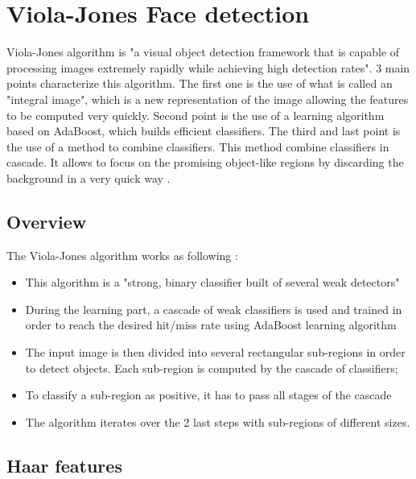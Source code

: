 \chapter{Viola-Jones Face detection}
\label{chap:vj}

\noindent Viola-Jones algorithm is "a visual object detection framework that is capable of processing images extremely rapidly while achieving high detection rates". 3 main points characterize this algorithm. The first one is the use of what is called an "integral image", which is a new representation of the image allowing the features to be computed very quickly. Second point is the use of a learning algorithm based on AdaBoost, which builds efficient classifiers. The third and last point is the use of a method to combine classifiers. This method combine classifiers in cascade. It allows to focus on the promising object-like regions by discarding the background in a very quick way \cite{VIO01}.
\newline

\section{Overview}

\vspace{\baselineskip}
\noindent The Viola-Jones algorithm works as following \cite{DIN08}:

\begin{itemize}
  \item This algorithm is a "strong, binary classifier built of several weak detectors"
  \item During the learning part, a cascade of weak classifiers is used and trained in order to reach the desired hit/miss rate using AdaBoost learning algorithm
  \item The input image is then divided into several rectangular sub-regions in order to detect objects. Each sub-region is computed by the cascade of classifiers;
  \item To classify a sub-region as positive, it has to pass all stages of the cascade
  \item The algorithm iterates over the 2 last steps with sub-regions of different sizes.
\end{itemize}

\section{Haar features}

